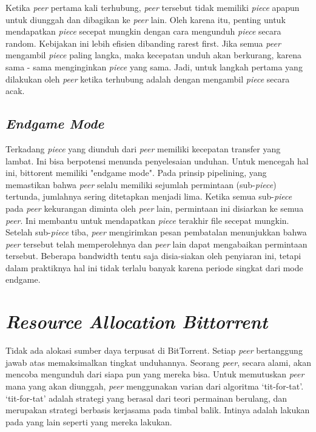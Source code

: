 Ketika \emph{peer} pertama kali terhubung, \emph{peer} tersebut tidak memiliki \emph{piece} apapun untuk diunggah dan dibagikan ke \emph{peer} lain. Oleh karena itu, penting untuk mendapatkan \emph{piece} secepat mungkin dengan cara mengunduh \emph{piece} secara random. Kebijakan ini lebih efisien dibanding rarest first. Jika semua \emph{peer} mengambil \emph{piece} paling langka, maka kecepatan unduh akan berkurang, karena sama - sama menginginkan \emph{piece} yang sama. Jadi, untuk langkah pertama yang dilakukan oleh \emph{peer} ketika terhubung adalah dengan mengambil \emph{piece} secara acak.

\subsection{\emph{Endgame Mode}}

Terkadang \emph{piece} yang diunduh dari \emph{peer} memiliki kecepatan transfer yang lambat. Ini bisa berpotensi menunda penyelesaian unduhan. Untuk mencegah hal ini, bittorent memiliki "endgame mode". Pada prinsip pipelining, yang memastikan bahwa \emph{peer} selalu memiliki sejumlah permintaan (sub-\emph{piece}) tertunda, jumlahnya sering ditetapkan menjadi lima. Ketika semua sub-\emph{piece} pada \emph{peer} kekurangan diminta oleh \emph{peer} lain, permintaan ini disiarkan ke semua \emph{peer}. Ini membantu untuk mendapatkan \emph{piece} terakhir file secepat mungkin. Setelah sub-\emph{piece} tiba, \emph{peer} mengirimkan pesan pembatalan menunjukkan bahwa \emph{peer} tersebut telah memperolehnya dan \emph{peer} lain dapat mengabaikan permintaan tersebut. Beberapa bandwidth tentu saja disia-siakan oleh penyiaran ini, tetapi dalam praktiknya hal ini tidak terlalu banyak karena periode singkat dari mode endgame.

\section{\emph{Resource Allocation Bittorrent}}

Tidak ada alokasi sumber daya terpusat di BitTorrent. Setiap \emph{peer} bertanggung jawab atas memaksimalkan tingkat unduhannya. Seorang \emph{peer}, secara alami, akan mencoba mengunduh dari siapa pun yang mereka bisa. Untuk memutuskan \emph{peer} mana yang akan diunggah, \emph{peer} menggunakan varian dari algoritma `tit-for-tat'. `tit-for-tat' adalah strategi yang berasal dari teori permainan berulang, dan merupakan strategi berbasis kerjasama pada timbal balik. Intinya adalah lakukan pada yang lain seperti yang mereka lakukan.

